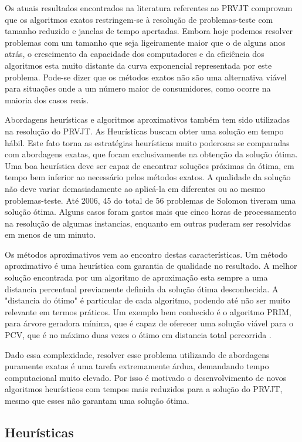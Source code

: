 Os atuais resultados encontrados na literatura referentes ao PRVJT comprovam que os algoritmos exatos restringem-se à resolução de problemas-teste com tamanho reduzido e janelas de tempo apertadas. Embora hoje podemos resolver problemas com um tamanho que seja ligeiramente maior que o de alguns anos atrás, o crescimento da capacidade dos computadores e da eficiência dos algoritmos esta muito distante da curva exponencial representada por este problema. Pode-se dizer que os métodos exatos não são uma alternativa viável para situações onde a um número maior de consumidores, como ocorre na maioria dos casos reais. \cite{Chabrier}

Abordagens heurísticas e algoritmos aproximativos também tem sido utilizadas na resolução do PRVJT. As Heurísticas buscam obter uma solução em tempo hábil. Este fato torna as estratégias heurísticas muito poderosas se comparadas com abordagens exatas, que focam exclusivamente na obtenção da solução ótima. Uma boa heurística deve ser capaz de encontrar soluções próximas da ótima, em tempo bem inferior ao necessário pelos métodos exatos. A qualidade da solução não deve variar demasiadamente ao aplicá-la em diferentes ou ao mesmo problemas-teste. Até 2006, 45 do total de 56 problemas de Solomon tiveram uma solução ótima. Alguns casos foram gastos mais que cinco horas de processamento na resolução de algumas instancias, enquanto em outras puderam ser resolvidas em menos de um minuto. ~\cite{Jepsen}

Os métodos aproximativos vem ao encontro destas características. Um método aproximativo é uma heurística com garantia de qualidade no resultado. A melhor solução encontrada por um algoritmo de aproximação esta sempre a uma distancia percentual previamente definida da solução ótima desconhecida. A "distancia do ótimo" é particular de cada algoritmo, podendo até não ser muito relevante em termos práticos. Um exemplo bem conhecido é o algoritmo PRIM, para árvore geradora mínima, que é capaz de oferecer uma solução viável para o PCV, que é no máximo duas vezes o ótimo em distancia total percorrida \cite{Alvarenga}.

Dado essa complexidade, resolver esse problema utilizando de abordagens puramente exatas é uma tarefa extremamente árdua, demandando tempo computacional muito elevado. Por isso é motivado o desenvolvimento de novos algoritmos heurísticos com tempos mais reduzidos para a solução do PRVJT, mesmo que esses não garantam uma solução ótima.

\subsection{Heurísticas}

